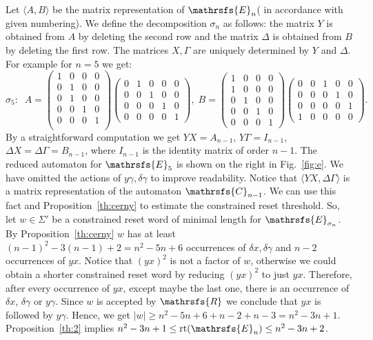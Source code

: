 \documentclass[11pt]{llncs}
\newcommand{\R}{\mathrsfs{R}}
\newcommand{\G}{\Gamma}
\newcommand{\D}{\Delta}
\newcommand{\g}{\gamma}
\newcommand{\dl}{\delta}
\newcommand{\rt}{\mathrm{rt}}
\begin{document}
Let $\langle A,B\rangle$ be the matrix representation of $\mathrsfs{E}_n$( in accordance with given numbering). We define the decomposition
$\sigma_n$ as follows: the matrix $Y$ is obtained from $A$ by deleting the second row and the matrix $\D$ is obtained from $B$ by deleting
the first row. The matrices $X, \G$ are uniquely determined by $Y$ and $\D$. For example for $n = 5$ we get:
$$\sigma_5: \;\;
A =
\left(
\begin{smallmatrix}
1&0&0&0\\
0&1&0&0\\
0&1&0&0\\
0&0&1&0\\
0&0&0&1\\
\end{smallmatrix}
\right)
\left(
\begin{smallmatrix}
0&1&0&0&0\\
0&0&1&0&0\\
0&0&0&1&0\\
0&0&0&0&1
\end{smallmatrix}
\right),\;
B =
\left(
\begin{smallmatrix}
1&0&0&0\\
1&0&0&0\\
0&1&0&0\\
0&0&1&0\\
0&0&0&1
\end{smallmatrix}
\right)
\left(
\begin{smallmatrix}
0&0&1&0&0\\
0&0&0&1&0\\
0&0&0&0&1\\
1&0&0&0&0
\end{smallmatrix}
\right).
$$
By a straightforward computation we get $YX = A_{n - 1}$, $Y\G = I_{n - 1}$, $\D X = \D\G = B_{n - 1}$, where $I_{n - 1}$ is the identity
matrix of order $n - 1$. The reduced automaton for $\mathrsfs{E}_5$ is shown on the right in Fig.~\ref{fig:e}. We have omitted the actions
of $y\g, \dl \g$ to improve readability. Notice that $\langle YX, \D\G\rangle$ is a matrix representation of the automaton $\mathrsfs{C}_{n
- 1}$. We can use this fact and Proposition~\ref{th:cerny} to estimate the constrained reset threshold. So, let $w \in \Sigma'$ be a
constrained reset word of minimal length for $\mathrsfs{E}_{\sigma_n}$. By Proposition~\ref{th:cerny} $w$ has at least $(n - 1)^2 - 3(n -
1) + 2 = n^2 - 5n + 6$ occurrences of $\dl x, \dl \g$ and $n - 2$ occurrences of $yx$. Notice that $(yx)^2$ is not a factor of $w$,
otherwise we could obtain a shorter constrained reset word by reducing $(yx)^2$ to just $yx$. Therefore, after every occurrence of $yx$,
except maybe the last one, there is an occurrence of $\dl x$, $\dl \g$ or $y \g$. Since $w$ is accepted by $\R$ we conclude that $yx$ is
followed by $y\g$. Hence, we get $|w| \geq n^2 - 5n + 6 + n - 2 + n - 3 = n^2 -3n + 1$. Proposition~\ref{th:2} implies $n^2 -3n + 1 \leq
\rt(\mathrsfs{E}_n) \leq n^2 -3n + 2$.
\end{document}
